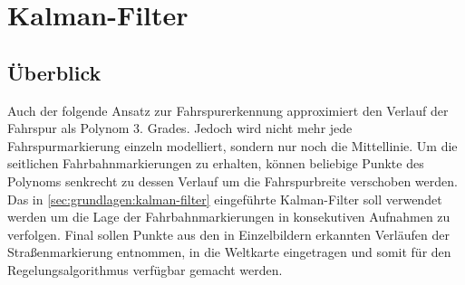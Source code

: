 \section{Kalman-Filter}
\label{sec:fahrspurerkennung_kalman}

\subsection{Überblick} \label{ssec:fahrspurerkennung:kalman-filter:ueberblick}
Auch der folgende Ansatz zur Fahrspurerkennung approximiert den Verlauf der Fahrspur als Polynom 3. Grades. Jedoch wird nicht mehr jede Fahrspurmarkierung einzeln modelliert, sondern nur noch die Mittellinie. Um die seitlichen Fahrbahnmarkierungen zu erhalten, können beliebige Punkte des Polynoms senkrecht zu dessen Verlauf um die Fahrspurbreite verschoben werden.
Das in \ref{sec:grundlagen:kalman-filter} eingeführte Kalman-Filter soll verwendet werden um die Lage der Fahrbahnmarkierungen in konsekutiven Aufnahmen zu verfolgen. Final sollen Punkte aus den in Einzelbildern erkannten Verläufen der Straßenmarkierung entnommen, in die Weltkarte eingetragen und somit für den Regelungsalgorithmus verfügbar gemacht werden.

